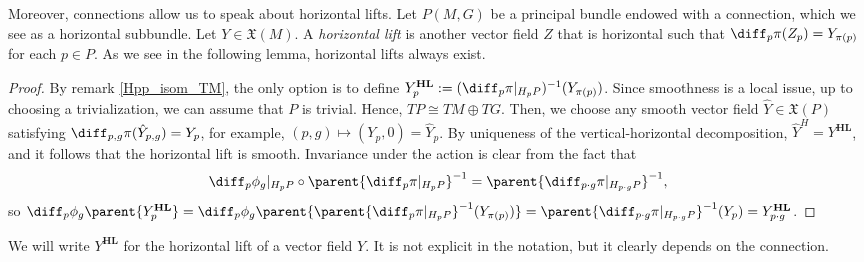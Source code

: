 Moreover, connections allow us to speak about horizontal lifts. Let \(P(M,G)\) be a principal bundle endowed with a connection, which we see as a horizontal subbundle. Let \(Y\in \mathfrak{X}(M)\). A \textit{horizontal lift} is another vector field \(Z\) that is horizontal such that \(\diff_p\pi(Z_p)=Y_{\pi(p)}\) for each \(p \in P\). As we see in the following lemma, horizontal lifts always exist.

\begin{proof}
    By remark \ref{Hpp_isom_TM}, the only option is to define \(Y^{\mathbf{HL}}_p:=(\diff_p\pi|_{H_pP})^{-1}(Y_{\pi(p)})\). Since smoothness is a local issue, up to choosing a trivialization, we can assume that \(P\) is trivial. Hence, \(TP \cong TM \oplus TG\). Then, we choose any smooth vector field \(\hat{Y}\in \mathfrak{X}(P)\) satisfying \(\diff_{p,g}\pi(\hat{Y}_{p,g})=Y_p\), for example, \((p,g)\mapsto (Y_p,0)=\hat{Y}_p\). By uniqueness of the vertical-horizontal decomposition, \(\hat{Y}^H=Y^{\mathbf{HL}}\), and it follows that the horizontal lift is smooth. Invariance under the action is clear from the fact that
    \[
    \diff_p\phi_g|_{H_pP} \circ \parent{\diff_p\pi|_{H_pP}}^{-1}=\parent{\diff_{p\cdot g}\pi|_{H_{p\cdot g}P}}^{-1},
    \]
    so \(\diff_p\phi_g\parent{Y^{\mathbf{HL}}_p}=\diff_p\phi_g\parent{\parent{\diff_p\pi|_{H_pP}}^{-1}(Y_{\pi(p)})}=\parent{\diff_{p\cdot g}\pi|_{H_{p\cdot g}P}}^{-1}(Y_p)=Y^{\mathbf{HL}}_{p\cdot g}\).
\end{proof}
We will write \(Y^{\mathbf{HL}}\) for the horizontal lift of a vector field \(Y\). It is not explicit in the notation, but it clearly depends on the connection. 

